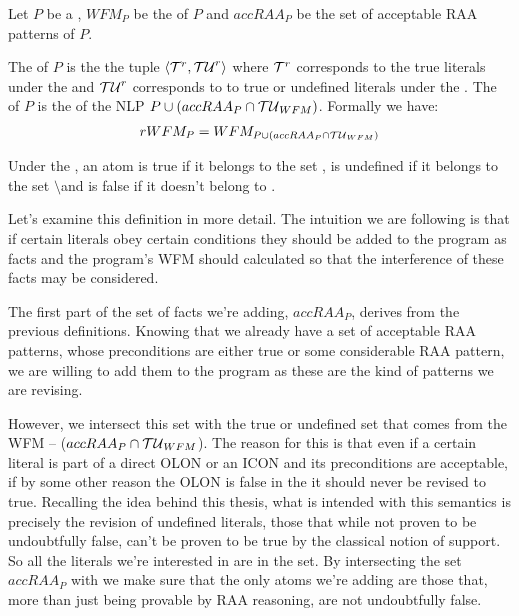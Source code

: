 \begin{definition}
\label{def:rwfs}
Let $P$ be a \nlp, $WFM_{P}$ be the \wfm of $P$ and $accRAA_{P}$ be the set of acceptable RAA patterns of $P$.

The \rwfm of $P$ is the the tuple $\langle{\cal{T}}^{r},{\cal{TU}}^{r}\rangle$ where ${\cal{T}}^{r}$ corresponds to the true literals under the \rwfs and ${\cal{TU}}^{r}$ corresponds to to true or undefined literals under the \rwfs. The \rwfm of $P$ is the \wfm of the NLP $P\cup\left(accRAA_{P}\cap {\cal{TU}}_{WFM}\right)$. Formally we have:
\begin{align*}
rWFM_{P} = WFM_{P\cup \left(accRAA_{P}\cap {\cal{TU}}_{WFM}\right)}
\end{align*}

Under the \rwfs, an atom is true if it belongs to the set \tRWFM, is undefined if it belongs to the set \tuRWFM$\setminus$\tRWFM and is false if it doesn't belong to \tuRWFM.
\end{definition}

Let's examine this definition in more detail. The intuition we are following is that if certain literals obey certain conditions they should be added to the program as facts and the program's WFM should calculated so that the interference of these facts may be considered.

The first part of the set of facts we're adding, $accRAA_{P}$, derives from the previous definitions. Knowing that we already have a set of acceptable RAA patterns, whose preconditions are either true or some considerable RAA pattern, we are willing to add them to the program as these are the kind of patterns we are revising.

However, we intersect this set with the true or undefined set that comes from the WFM -- ($accRAA_{P}\cap {\cal{TU}}_{WFM}$). The reason for this is that even if a certain literal is part of a direct OLON or an ICON and its preconditions are acceptable, if by some other reason the OLON is false in the \wfm it should never be revised to true. Recalling the idea behind this thesis, what is intended with this semantics is precisely the revision of undefined literals, those that while not proven to be undoubtfully false, can't be proven to be true by the classical notion of support. So all the literals we're interested in are in the \tuWFM set. By intersecting the set $accRAA_{P}$ with \tuWFM we make sure that the only atoms we're adding are those that, more than just being provable by RAA reasoning, are not undoubtfully false.


